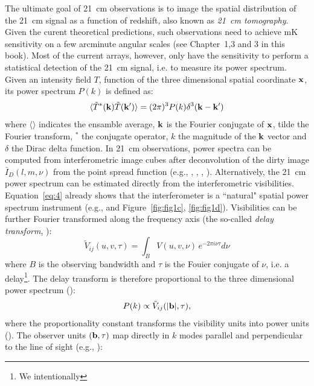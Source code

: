The ultimate goal of 21~cm observations is to image the spatial distribution of the 21~cm signal as a function of redshift, also known as {\it 21~cm tomography}. Given the curent theoretical predictions, such observations need to achieve mK sensitivity on a few arcminute angular scales (see Chapter~1,3 and 3 in this book). Most of the current arrays, however, only have the sensitivity to perform a statistical detection of the 21~cm signal, i.e. to measure its power spectrum. Given an intensity field $T$, function of the three dimensional spatial coordinate $\bf x$, its power spectrum $P(k)$ is defined as:
\begin{equation}
\langle {\tilde T}^* ({\bf k}) {\tilde T}({\bf k'}) \rangle = (2 \pi)^3 P(k) \delta^3({\bf k} - {\bf k}')
\label{sec_observables_eq1}
\end{equation}
where $\langle \rangle$ indicates the ensamble average, $\bf k$ is the Fourier conjugate of $\bf x$, tilde the Fourier transform, $^*$ the conjugate operator, $k$ the magnitude of the $\bf k$ vector and $\delta$ the Dirac delta function. In 21~cm observations, power spectra can be computed from interferometric image cubes after deconvolution of the dirty image ${\bar I}_D (l,m,\nu)$ from the point spread function (e.g., \cite{pen09}, \cite{harker10}, \cite{beardsley16}, \cite{patil17}). Alternatively, the 21~cm power spectrum can be estimated directly from the interferometric visibilities. Equation~\ref{eq:4} already shows that the interferometer is a ``natural" spatial power spectrum instrument (e.g., \cite{white99} and Figure~\ref{fig:fig1c}, \ref{fig:fig1d}). Visibilities can be further Fourier transformed along the frequency axis (the so-called {\it delay transform}, \cite{parsons12a}): 
\begin{equation}
{\tilde V}_{ij} (u,v, \tau) = \int_B V (u,v, \nu) \, e^{-2 \pi i \nu \tau} d \nu
\label{sec_observables_eq2}
\end{equation}
where $B$ is the observing bandwidth and $\tau$ is the Fouier conjugate of $\nu$, i.e. a delay\footnote{We intentionally }. The delay transform is therefore proportional to the three dimensional power spectrum (\cite{parsons12b}):
\begin{equation}
P(k) \propto {\tilde V}_{ij} (|{\bf b}|, \tau),
\label{sec_observables_eq3}
\end{equation}
where the proportionality constant transforms the visibility units into power units (\cite{parsons12b}). The observer units $({\bf b},\tau)$ map directly in $k$ modes parallel and perpendicular to the line of sight (e.g., \cite{morales04}):

